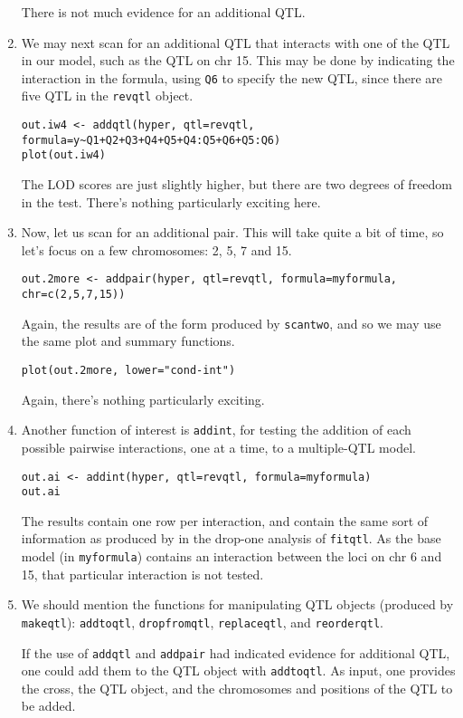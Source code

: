 \documentclass[10pt,letterpaper]{article}
\newcommand{\usercolor}{\color [named]{BlueViolet}}
\begin{document}
\begin{enumerate}
There is not much evidence for an additional QTL.

\item We may next scan for an additional QTL that interacts with one
  of the QTL in our model, such as the QTL on chr 15.  This may be done
  by indicating the interaction in the formula, using \verb-Q6- to
  specify the new QTL, since there are five QTL in the \verb-revqtl- object.

\usercolor
\verb|out.iw4 <- addqtl(hyper, qtl=revqtl, formula=y~Q1+Q2+Q3+Q4+Q5+Q4:Q5+Q6+Q5:Q6)| \\
\verb|plot(out.iw4)| 
\normalcolor

The LOD scores are just slightly higher, but there are two degrees of
freedom in the test.  There's nothing particularly exciting here.

\item Now, let us scan for an additional pair.  This will take
  quite a bit of time, so let's focus on a few chromosomes: 2, 5, 7
  and 15.

\usercolor
\verb|out.2more <- addpair(hyper, qtl=revqtl, formula=myformula, chr=c(2,5,7,15))| 
\normalcolor

Again, the results are of the form produced by \verb-scantwo-, and so
we may use the same plot and summary functions.

\usercolor
\verb|plot(out.2more, lower="cond-int")|
\normalcolor

Again, there's nothing particularly exciting.  

\item Another function of interest is \verb-addint-, for testing the
  addition of each possible pairwise interactions, one at a time, to a
  multiple-QTL model.  

\usercolor
\verb|out.ai <- addint(hyper, qtl=revqtl, formula=myformula)| \\
\verb|out.ai|
\normalcolor

The results contain one row per interaction, and contain the same sort
of information as produced by in the drop-one analysis of
\verb-fitqtl-.  As the base model (in \verb-myformula-) contains an
interaction between the loci on chr 6 and 15, that particular
interaction is not tested.

\item We should mention the functions for manipulating
  QTL objects (produced by \verb-makeqtl-): \verb-addtoqtl-,
  \verb-dropfromqtl-, \verb-replaceqtl-, and \verb-reorderqtl-.  

  If the use of \verb-addqtl- and \verb-addpair- had indicated
  evidence for additional QTL, one could add them to the QTL object
  with \verb-addtoqtl-.  As input, one provides the cross, the QTL
  object, and the chromosomes and positions of the QTL to be added.


\end{enumerate}
\end{document}
